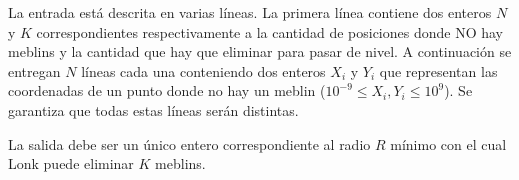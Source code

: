 \documentclass{oci}
\begin{document}
\begin{inputDescription}
  La entrada está descrita en varias líneas.
  La primera línea contiene dos enteros $N$ y $K$ correspondientes
  respectivamente a la cantidad de posiciones donde NO hay meblins y la cantidad
  que hay que eliminar para pasar de nivel.
  A continuación se entregan $N$ líneas cada una conteniendo dos enteros $X_i$ y
  $Y_i$ que representan las coordenadas de un punto donde no hay un meblin
  ($10^{-9}\leq X_i, Y_i\leq 10^9$).
  Se garantiza que todas estas líneas serán distintas.
\end{inputDescription}

\begin{outputDescription}
  La salida debe ser un único entero correspondiente al radio $R$
  mínimo con el cual Lonk puede eliminar $K$ meblins.
\end{outputDescription}


\begin{sampleDescription}
\end{sampleDescription}
\end{document}
